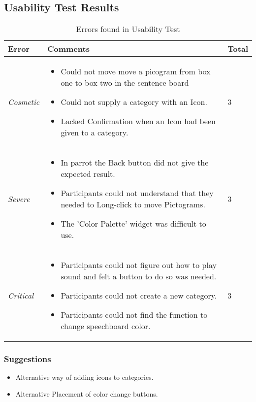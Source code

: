 \subsection{Usability Test Results}

\begin{table}
	\centering
		\begin{tabular}{l | l | l}
		\hline
			\textbf{Error} & \textbf{Comments} & Total\\
		\hline
			\textit{Cosmetic} & \begin{itemize} 
														\item Could not move move a picogram from box one to box two in the sentence-board
														\item Could not supply a category with an Icon.
														\item Lacked Confirmation when an Icon had been given to a category.
													\end{itemize} & 3 \\
		\hline
			\textit{Severe} & \begin{itemize}
													\item In parrot the Back button did not give the expected result.
													\item Participants could not understand that they needed to Long-click to move Pictograms.
													\item The 'Color Palette' widget was difficult to use.
												\end{itemize} & 3 \\
		\hline
			\textit{Critical} & \begin{itemize}
														\item Participants could not figure out how to play sound and felt a button to do so was needed.
														\item Participants could not create a new category.
														\item Participants could not find the function to change speechboard color.
													\end{itemize} & 3 \\
		\hline
		\end{tabular}
	\caption{Errors found in Usability Test}
	\label{tab:ErrorsFoundInUsabilityTest}
\end{table}

\subsubsection{Suggestions}
\begin{itemize}
	\item Alternative way of adding icons to categories.
	\item Alternative Placement of color change buttons. 
\end{itemize}